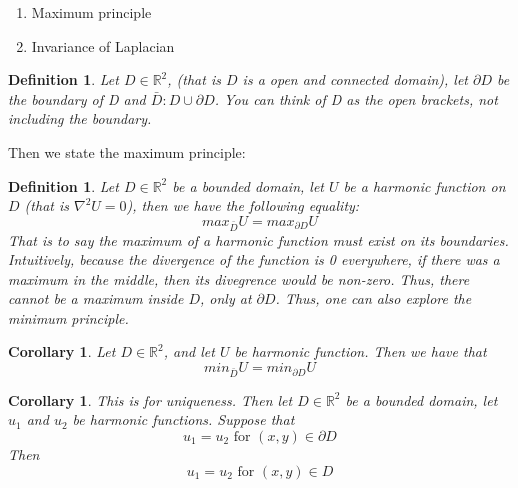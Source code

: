 \documentclass{article}
\newtheorem{definition}[theorem]{Definition}
\newtheorem{corollary}[theorem]{Corollary}
\begin{document}
\begin{enumerate}
    \item Maximum principle
    \item Invariance of Laplacian
\end{enumerate}

\begin{definition}
    Let $D \in \mathbb{R}^2$, (that is $D$ is a open and connected domain), let $\partial D$ be the boundary of D and $\bar{D}: D \cup \partial D$. You can think of D as the open brackets, not including the boundary. 
\end{definition}

Then we state the maximum principle:

\begin{definition}
    Let $D \in \mathbb{R}^2$ be a bounded domain, let $U$ be a harmonic function on $D$ (that is $\nabla^2 U = 0$), then we have the following equality:
    \begin{equation}
        max_{\bar{D}}U = max_{\partial D} U
    \end{equation} 
    That is to say the maximum of a harmonic function must exist on its boundaries. Intuitively, because the divergence of the function is 0 everywhere, if there was a maximum in the middle, then its divegrence would be non-zero. Thus, 
    there cannot be a maximum inside $D$, only at $\partial D$. Thus, one can also explore the minimum principle. 
\end{definition}

\begin{corollary}
    Let $D \in \mathbb{R}^2$, and let $U$ be harmonic function. Then we have that 
    \begin{equation}
        min_{\bar{D}}U = min_{\partial D}U
    \end{equation}
\end{corollary}

\begin{corollary}
    This is for uniqueness. Then let $D \in \mathbb{R}^2$ be a bounded domain, let $u_1$ and $u_2$ be harmonic functions. Suppose that 
    \begin{equation}
        u_1 = u_2 \textrm{ for } (x,y) \in \partial D
    \end{equation}
    Then
    \begin{equation}
        u_1 = u_2 \textrm{ for } (x,y) \in D
    \end{equation}
\end{corollary}
\end{document}
